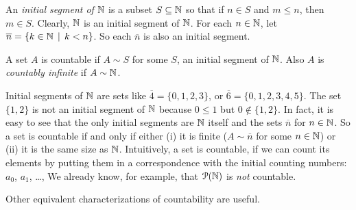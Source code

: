 \begin{defn}
An \emph{initial segment of $\mathbb N$} is a subset $S\subseteq \mathbb N$ so that if $n\in S$ and $m\leq n$, then $m\in S$. Clearly, $\mathbb N$ is an initial segment of $\mathbb N$.
For each $n\in \mathbb N$, let $\overline n = \{k\in \mathbb N\,\mid\, k<n\}$. So each $\overline n$ is also an initial segment.

A set $A$ is countable if $A\sim S$ for some $S$, an initial segment of $\mathbb N$. Also $A$ is \emph{countably infinite} if $A\sim \mathbb N$.
\end{defn}

Initial segments of $\mathbb N$ are sets like $\overline 4=\{0,1,2,3\}$, or $\overline 6 = \{0,1,2,3,4,5\}$. 
The set $\{1,2\}$ is not an initial segment of $\mathbb N$ because $0\leq 1$ but $0\notin \{1,2\}$. In fact, it is easy to see that the only initial segments are $\mathbb N$ itself and the sets $\overline n$ for $n\in\mathbb N$. 
So a set is countable if and only if either (i) it is finite ($A\sim\overline n$ for some $n\in\mathbb N$) or (ii) it is the same size as $\mathbb N$. 
Intuitively, a set is countable, if we can count its elements by putting them in a correspondence with the initial counting numbers: $a_0$, $a_1$, \ldots,  
We already know, for example, that ${\mathcal{P}}(\mathbb N)$ is \emph{not} countable.

Other equivalent characterizations of countability are useful.

